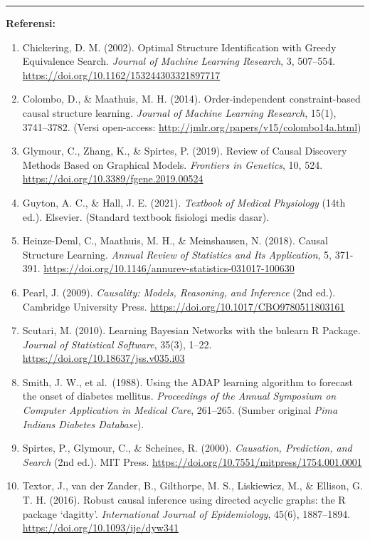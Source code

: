 \documentclass[
  11pt,
]{article}
\providecommand{\tightlist}{%
  \setlength{\itemsep}{0pt}\setlength{\parskip}{0pt}}
\begin{document}
\begin{center}\rule{0.5\linewidth}{0.5pt}\end{center}

\textbf{Referensi:}

\begin{enumerate}
\def\labelenumi{\arabic{enumi}.}
\tightlist
\item
  Chickering, D. M. (2002). Optimal Structure Identification with Greedy
  Equivalence Search. \emph{Journal of Machine Learning Research}, 3,
  507--554. \url{https://doi.org/10.1162/153244303321897717}
\item
  Colombo, D., \& Maathuis, M. H. (2014). Order-independent
  constraint-based causal structure learning. \emph{Journal of Machine
  Learning Research}, 15(1), 3741--3782. (Versi open-access:
  \url{http://jmlr.org/papers/v15/colombo14a.html})
\item
  Glymour, C., Zhang, K., \& Spirtes, P. (2019). Review of Causal
  Discovery Methods Based on Graphical Models. \emph{Frontiers in
  Genetics}, 10, 524. \url{https://doi.org/10.3389/fgene.2019.00524}
\item
  Guyton, A. C., \& Hall, J. E. (2021). \emph{Textbook of Medical
  Physiology} (14th ed.). Elsevier. (Standard textbook fisiologi medis
  dasar).
\item
  Heinze-Deml, C., Maathuis, M. H., \& Meinshausen, N. (2018). Causal
  Structure Learning. \emph{Annual Review of Statistics and Its
  Application}, 5, 371-391.
  \url{https://doi.org/10.1146/annurev-statistics-031017-100630}
\item
  Pearl, J. (2009). \emph{Causality: Models, Reasoning, and Inference}
  (2nd ed.). Cambridge University Press.
  \url{https://doi.org/10.1017/CBO9780511803161}
\item
  Scutari, M. (2010). Learning Bayesian Networks with the bnlearn R
  Package. \emph{Journal of Statistical Software}, 35(3), 1--22.
  \url{https://doi.org/10.18637/jss.v035.i03}
\item
  Smith, J. W., et al.~(1988). Using the ADAP learning algorithm to
  forecast the onset of diabetes mellitus. \emph{Proceedings of the
  Annual Symposium on Computer Application in Medical Care}, 261--265.
  (Sumber original \emph{Pima Indians Diabetes Database}).
\item
  Spirtes, P., Glymour, C., \& Scheines, R. (2000). \emph{Causation,
  Prediction, and Search} (2nd ed.). MIT Press.
  \url{https://doi.org/10.7551/mitpress/1754.001.0001}
\item
  Textor, J., van der Zander, B., Gilthorpe, M. S., Liskiewicz, M., \&
  Ellison, G. T. H. (2016). Robust causal inference using directed
  acyclic graphs: the R package `dagitty'. \emph{International Journal
  of Epidemiology}, 45(6), 1887--1894.
  \url{https://doi.org/10.1093/ije/dyw341}
\end{enumerate}
\end{document}
